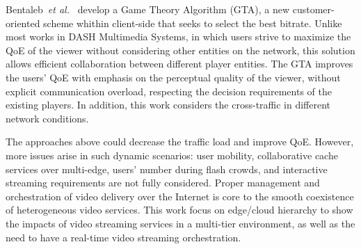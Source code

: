 Bentaleb~\textit{et al.}~\cite{bentaleb:2018:MSys} develop a Game Theory Algorithm (GTA), a new customer-oriented scheme whithin client-side that seeks to select the best bitrate. Unlike most works in DASH Multimedia Systems, in which users strive to maximize the QoE of the viewer without considering other entities on the network, this solution allows efficient collaboration between different player entities. The GTA improves the users' QoE with emphasis on the perceptual quality of the viewer, without explicit communication overload, respecting the decision requirements of the existing players. In addition, this work considers the cross-traffic in different network conditions.

The approaches above could decrease the traffic load and improve QoE. However, more issues arise in such dynamic scenarios: user mobility, collaborative cache services over multi-edge, users' number during flash crowds, and interactive streaming requirements are not fully considered.  Proper management and orchestration of video delivery over the Internet is core to the smooth coexistence of heterogeneous video services. This work focus on edge/cloud hierarchy to show the impacts of video streaming services in a multi-tier environment, as well as the need to have a real-time video streaming orchestration.

%
%
